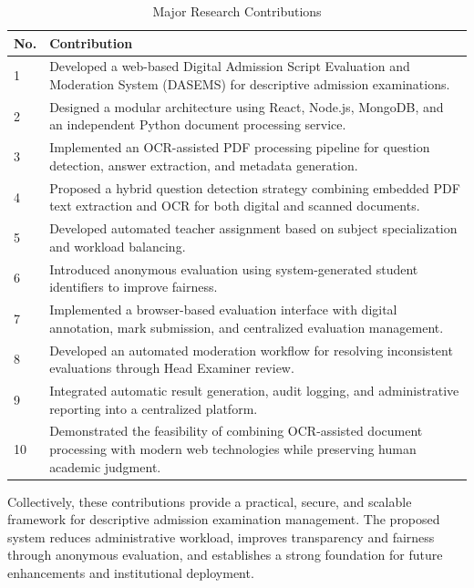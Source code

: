 \begin{table}[ht]
\centering
\caption{Major Research Contributions}
\label{tab:research_contributions}
\renewcommand{\arraystretch}{1.3}
\begin{tabular}{|p{2cm}|p{11.5cm}|}
\hline
\textbf{No.} & \textbf{Contribution} \\
\hline
1 & Developed a web-based Digital Admission Script Evaluation and Moderation System (DASEMS) for descriptive admission examinations. \\
\hline
2 & Designed a modular architecture using React, Node.js, MongoDB, and an independent Python document processing service. \\
\hline
3 & Implemented an OCR-assisted PDF processing pipeline for question detection, answer extraction, and metadata generation. \\
\hline
4 & Proposed a hybrid question detection strategy combining embedded PDF text extraction and OCR for both digital and scanned documents. \\
\hline
5 & Developed automated teacher assignment based on subject specialization and workload balancing. \\
\hline
6 & Introduced anonymous evaluation using system-generated student identifiers to improve fairness. \\
\hline
7 & Implemented a browser-based evaluation interface with digital annotation, mark submission, and centralized evaluation management. \\
\hline
8 & Developed an automated moderation workflow for resolving inconsistent evaluations through Head Examiner review. \\
\hline
9 & Integrated automatic result generation, audit logging, and administrative reporting into a centralized platform. \\
\hline
10 & Demonstrated the feasibility of combining OCR-assisted document processing with modern web technologies while preserving human academic judgment. \\
\hline
\end{tabular}
\end{table}

Collectively, these contributions provide a practical, secure, and scalable framework for descriptive admission examination management. The proposed system reduces administrative workload, improves transparency and fairness through anonymous evaluation, and establishes a strong foundation for future enhancements and institutional deployment.

